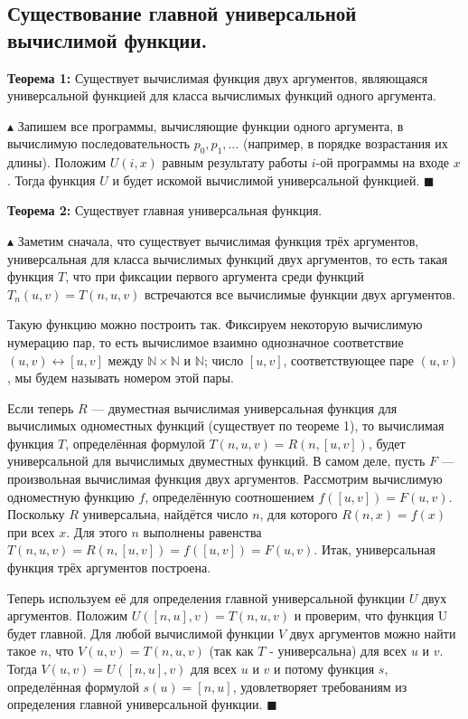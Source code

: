 \subsection{Существование главной универсальной вычислимой функции.}
\par \textbf{Теорема 1:} Существует вычислимая функция двух аргументов, являющаяся универсальной функцией для класса вычислимых функций одного аргумента.
\par $\blacktriangle$ Запишем все программы, вычисляющие функции одного аргумента, в вычислимую последовательность $p_0, p_1, \ldots$ (например, в порядке возрастания их длины). Положим $U(i, x)$ равным результату работы $i$-ой программы на входе $x$. Тогда функция $U$ и будет искомой вычислимой универсальной функцией. $\blacksquare$ 
\par \textbf{Теорема 2:} Существует главная универсальная функция.
\par $\blacktriangle$ Заметим сначала, что существует вычислимая функция трёх аргументов, универсальная для класса вычислимых функций двух аргументов, то есть такая функция $T$, что при фиксации первого аргумента среди функций $T_n(u, v) = T(n, u, v)$ встречаются все вычислимые функции двух аргументов.
\par Такую функцию можно построить так. Фиксируем некоторую вычислимую нумерацию пар, то есть вычислимое взаимно однозначное соответствие $(u, v) \leftrightarrow [u, v]$ между $\mathbb{N} \times \mathbb{N}$ и $\mathbb{N}$; число $[u, v]$, соответствующее паре $(u, v)$, мы будем называть номером этой пары.
\par Если теперь $R$ — двуместная вычислимая универсальная функция
для вычислимых одноместных функций (существует по теореме 1), то вычислимая функция $T$,
определённая формулой $T(n, u, v) = R(n, [u, v])$, будет универсальной для вычислимых двуместных функций. В самом деле, пусть $F$ —
произвольная вычислимая функция двух аргументов. Рассмотрим
вычислимую одноместную функцию $f$, определённую соотношением $f([u, v]) = F(u, v)$. Поскольку $R$ универсальна, найдётся число $n$,
для которого $R(n, x) = f(x)$ при всех $x$. Для этого $n$ выполнены равенства $T(n, u, v) = R(n, [u, v]) = f([u, v]) = F(u, v)$. Итак, универсальная функция
трёх аргументов построена.
\par Теперь используем её для определения главной универсальной
функции $U$ двух аргументов. Положим $U([n, u], v) = T(n, u, v)$ и проверим, что функция U будет главной. Для любой вычислимой функции $V$ двух аргументов можно найти такое $n$, что $V (u, v) = T(n, u, v)$ (так как $T$ - универсальна) для всех $u$ и $v$. Тогда $V (u, v) = U([n, u], v)$ для всех $u$ и $v$ и потому функция $s$, определённая формулой $s(u) = [n, u]$, удовлетворяет требованиям из
определения главной универсальной функции. $\blacksquare$

